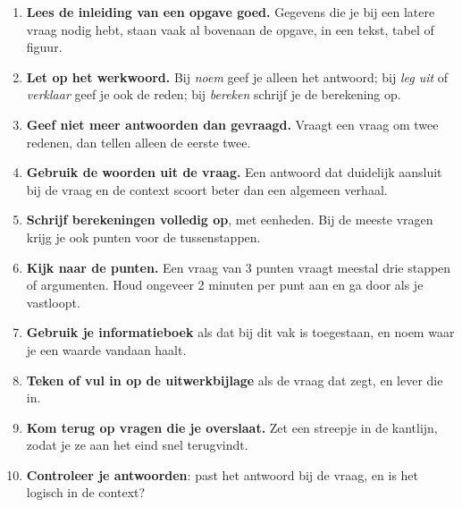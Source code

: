 {\small\opmaakproza
\begin{enumerate}[leftmargin=1.5em,itemsep=3pt,label=\textcolor{kleur1}{\sffamily\bfseries\arabic*}]
\item \textbf{Lees de inleiding van een opgave goed.} Gegevens die je bij een latere vraag nodig hebt, staan vaak
  al bovenaan de opgave, in een tekst, tabel of figuur.
\item \textbf{Let op het werkwoord.} Bij \emph{noem} geef je alleen het antwoord; bij \emph{leg uit} of \emph{verklaar}
  geef je ook de reden; bij \emph{bereken} schrijf je de berekening op.
\item \textbf{Geef niet meer antwoorden dan gevraagd.} Vraagt een vraag om twee redenen, dan tellen alleen de eerste twee.
\item \textbf{Gebruik de woorden uit de vraag.} Een antwoord dat duidelijk aansluit bij de vraag en de context
  scoort beter dan een algemeen verhaal.
\item \textbf{Schrijf berekeningen volledig op}, met eenheden. Bij de meeste vragen krijg je ook punten voor de tussenstappen.
\item \textbf{Kijk naar de punten.} Een vraag van 3 punten vraagt meestal drie stappen of argumenten.
  Houd ongeveer 2 minuten per punt aan en ga door als je vastloopt.
\item \textbf{Gebruik je informatieboek} als dat bij dit vak is toegestaan, en noem waar je een waarde vandaan haalt.
\item \textbf{Teken of vul in op de uitwerkbijlage} als de vraag dat zegt, en lever die in.
\item \textbf{Kom terug op vragen die je overslaat.} Zet een streepje in de kantlijn, zodat je ze aan het eind snel terugvindt.
\item \textbf{Controleer je antwoorden}: past het antwoord bij de vraag, en is het logisch in de context?
\end{enumerate}\par}
